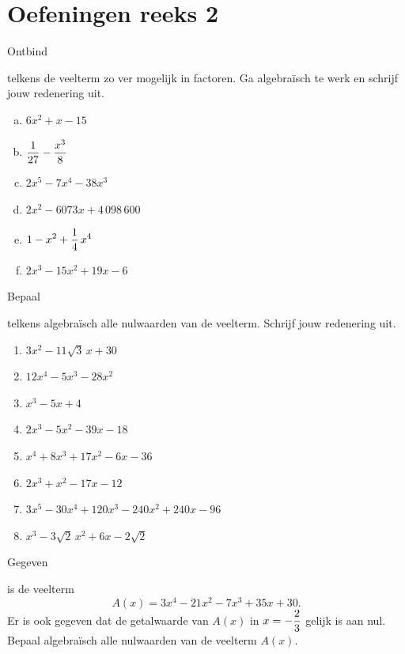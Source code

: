 \documentclass{ximera}
\begin{document}
\section*{Oefeningen reeks 2}

\begin{Oefening}\setcounter{enumi}{5} 
\hypertarget{oef4.5}{Ontbind} telkens de veelterm zo ver mogelijk in factoren. Ga algebra\"isch te werk en schrijf jouw redenering uit.  
\begin{multicols}{2}
\begin{enumerate}[(a)]
\item
$6x^2+x-15$
\item
$\displaystyle \frac{1}{27} - \frac{x^3}{8}$
\item
$2x^5-7x^4-38x^3$
\item
$2x^2 - 6073x + 4\,098\,600$
\item
$\displaystyle 1-x^2+\frac{1}{4}\,x^4$
\item
$2x^3 - 15x^2 + 19x - 6$
\end{enumerate}
\end{multicols}
\end{Oefening}

\begin{Oefening}\setcounter{enumi}{6}  
\hypertarget{oef4.6}{Bepaal} telkens algebra\"isch alle nulwaarden van de veelterm. Schrijf jouw redenering uit.
\begin{multicols}{2}
\begin{enumerate}
\item
$3x^2-11\sqrt{3}\,x+30$
\item
$12x^4-5x^3-28x^2$
\item
$x^3-5x+4$
\item
$2x^3 - 5x^2 - 39x - 18$
\item
$x^4+8x^3+17x^2-6x-36$
\item
$2x^3+x^2-17x-12$ 
\item
$3x^5-30x^4+120x^3-240x^2+240x-96$
\item
$x^3 - 3\sqrt{2}\,x^2 + 6x - 2\sqrt{2}\,$
\end{enumerate}
\end{multicols}
\end{Oefening}

\begin{Oefening}\setcounter{enumi}{7}   
\hypertarget{oef4.7}{Gegeven} is de veelterm
\[
A(x) = 3x^4-21x^2-7x^3+35x+30.
\]
Er is ook gegeven dat de getalwaarde van $A(x)$ in $\displaystyle x = -\frac{2}{3}$ gelijk is aan nul. Bepaal algebra\"isch alle nulwaarden van de veelterm $A(x)$.
\end{Oefening}
\end{document}
